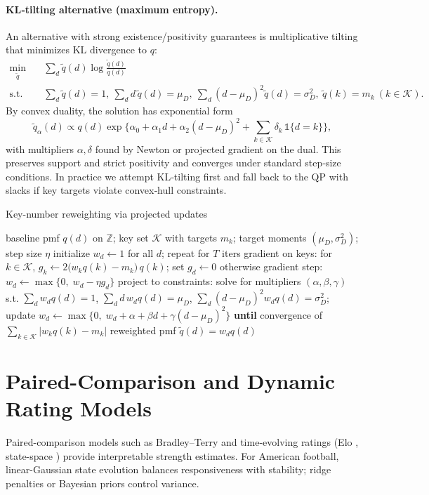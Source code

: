 \paragraph{KL‑tilting alternative (maximum entropy).}\label{subsec:key-kl}
An alternative with strong existence/positivity guarantees is multiplicative tilting that minimizes KL divergence to $q$:
\begin{align*}
\min_{\tilde q}\quad & \sum_d \tilde q(d)\log\frac{\tilde q(d)}{q(d)}\\
\text{s.t.}\quad & \sum_d \tilde q(d)=1,\ \sum_d d\,\tilde q(d)=\mu_D,\ \sum_d (d-\mu_D)^2\tilde q(d)=\sigma_D^2,\ \tilde q(k)=m_k\ (k\in\mathcal{K}).
\end{align*}
By convex duality, the solution has exponential form
\[
\tilde q_\alpha(d)\propto q(d)\exp\{\alpha_0+\alpha_1 d+\alpha_2 (d-\mu_D)^2+\sum_{k\in\mathcal{K}}\delta_k\,\mathbb{1}\{d=k\}\},
\]
with multipliers $\alpha,\delta$ found by Newton or projected gradient on the dual. This preserves support and strict positivity and converges under standard step‑size conditions. In practice we attempt KL‑tilting first and fall back to the QP with slacks if key targets violate convex‑hull constraints.

\begin{algorithm}[t]
  \caption{Key-number reweighting via projected updates}
  \label{alg:key-reweight}
  \begin{algorithmic}[1]
    \Require baseline pmf $q(d)$ on $\mathbb{Z}$; key set $\mathcal{K}$ with targets $m_k$; target moments $(\mu_D,\sigma_D^2)$; step size $\eta$
    \State initialize $w_d\leftarrow 1$ for all $d$; repeat for $T$ iters
    \State gradient on keys: for $k\in\mathcal{K}$, \; $g_k \leftarrow 2\big(w_k q(k)-m_k\big)\,q(k)$; set $g_d\leftarrow 0$ otherwise
    \State gradient step: $w_d \leftarrow \max\{0,\; w_d - \eta g_d\}$
    \State project to constraints: solve for multipliers $(\alpha,\beta,\gamma)$ s.t.
      $\sum_d w_d q(d)=1$, $\sum_d d\,w_d q(d)=\mu_D$, $\sum_d (d-\mu_D)^2 w_d q(d)=\sigma_D^2$;
      update $w_d \leftarrow \max\{0,\; w_d + \alpha + \beta d + \gamma (d-\mu_D)^2\}$
    \State \textbf{until} convergence of $\sum_{k\in\mathcal{K}}|w_k q(k)-m_k|$
    \State \Return reweighted pmf $\tilde q(d)=w_d q(d)$
  \end{algorithmic}
\end{algorithm}

\section{Paired-Comparison and Dynamic Rating Models}
\label{sec:paired}
Paired-comparison models such as Bradley--Terry \citep{bradleyterry1952} and time-evolving ratings (Elo \citep{elo1978}, state-space \citep{glickman1998}) provide interpretable strength estimates. For American football, linear-Gaussian state evolution \citep{glickman1998} balances responsiveness with stability; ridge penalties or Bayesian priors control variance.

